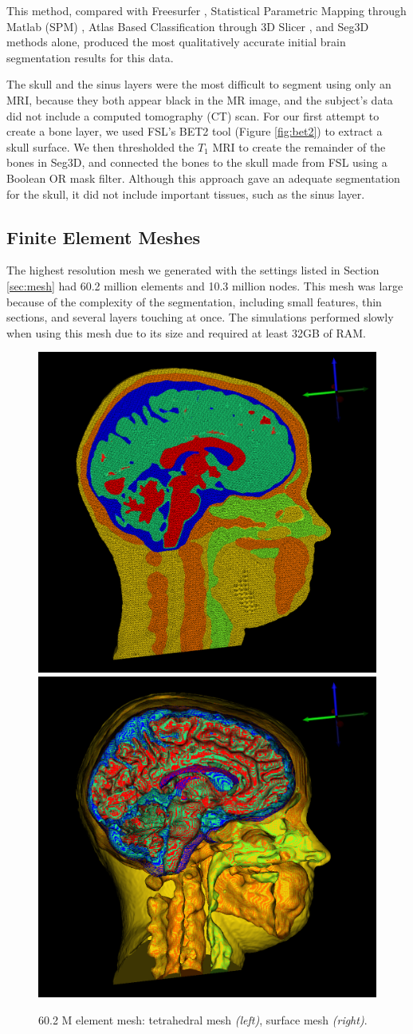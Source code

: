 This method, compared with Freesurfer \cite{ref:freesurf}, Statistical Parametric Mapping through Matlab (SPM) \cite{ref:spm}, Atlas Based Classification through 3D Slicer \cite{ref:abc}, and Seg3D methods alone, produced the most qualitatively accurate initial brain segmentation results for this data.

The skull and the sinus layers were the most difficult to segment using only an MRI, because they both appear black in the MR image, and the subject's data did not include a computed tomography (CT) scan. For our first attempt to create a bone layer, we used FSL's BET2 tool (Figure \ref{fig:bet2}) to extract a skull surface. We then thresholded the $T_1$ MRI to create the remainder of the bones in Seg3D, and connected the bones to the skull made from FSL using a Boolean OR mask filter. Although this approach gave an adequate segmentation for the skull, it did not include important tissues, such as the sinus layer. 

\subsection{Finite Element Meshes}

The highest resolution mesh we generated with the settings listed in Section \ref{sec:mesh} had 60.2 million elements and 10.3 million nodes. This mesh was large because of the complexity of the segmentation, including small features, thin sections, and several layers touching at once. The simulations performed slowly when using this mesh due to its size and required at least 32GB of RAM.

\begin{figure}[H]
\begin{center}
\includegraphics[width=.49\textwidth]{Figures/bigmesh_1}
\includegraphics[width=.49\textwidth]{Figures/bigmesh_surface}
\caption{60.2 M element mesh: tetrahedral mesh \textit{(left)}, surface mesh \textit{(right)}.}
\label{fig:bigmesh}
\end{center}
\end{figure}


